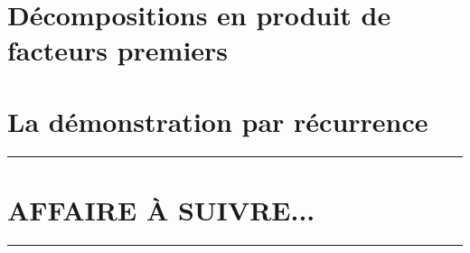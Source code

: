 \documentclass[12pt]{amsart}
\begin{document}


\section{Décompositions en produit de facteurs premiers}






\section{La démonstration par récurrence}






%
%
%
%





\bigskip

\hrule

\section{AFFAIRE À SUIVRE...}

\bigskip

\hrule

%
%
%
%
%
%
%
%
\end{document}
